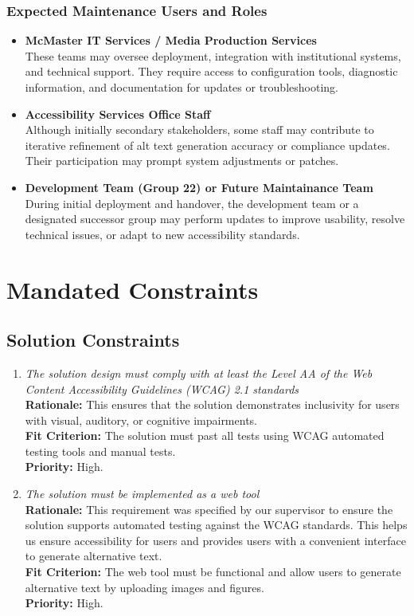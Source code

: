 \documentclass[12pt]{article}
\begin{document}
\subsubsection*{Expected Maintenance Users and Roles}
\begin{itemize}
  \item \textbf{McMaster IT Services / Media Production Services} \\
    These teams may oversee deployment, integration with
    institutional systems, and technical support. They require access
    to configuration tools, diagnostic information, and documentation
    for updates or troubleshooting.
  \item \textbf{Accessibility Services Office Staff} \\
    Although initially secondary stakeholders, some staff may
    contribute to iterative refinement of alt text generation
    accuracy or compliance updates. Their participation may prompt
    system adjustments or patches.
  \item \textbf{Development Team (Group 22) or Future Maintainance Team} \\
    During initial deployment and handover, the development team or a
    designated successor group may perform updates to improve
    usability, resolve technical issues, or adapt to new
    accessibility standards.
\end{itemize}

\section{Mandated Constraints}
\subsection{Solution Constraints}
\begin{enumerate}[label=MD-SL \arabic*., wide=0pt, leftmargin=*]
  \item \emph{The solution design must comply with at least the Level
    AA of the Web Content Accessibility Guidelines (WCAG) 2.1 standards}\\[2mm]
    {\bf Rationale:} This ensures that the solution demonstrates
    inclusivity for users with visual, auditory, or cognitive impairments. \\
    {\bf Fit Criterion:} The solution must past all tests using WCAG
    automated testing tools and manual tests.\\
    {\bf Priority:} High.
  \item \emph{The solution must be implemented as a web tool}\\[2mm]
    {\bf Rationale:} This requirement was specified by our supervisor to ensure 
    the solution supports automated testing 
    against the WCAG standards. This helps us ensure accessibility for users
    and provides users with a convenient interface to generate alternative text.\\
    {\bf Fit Criterion:} The web tool must be functional and allow
    users to generate alternative text by uploading
    images and figures.\\
    {\bf Priority:} High.
\end{enumerate}
\end{document}
